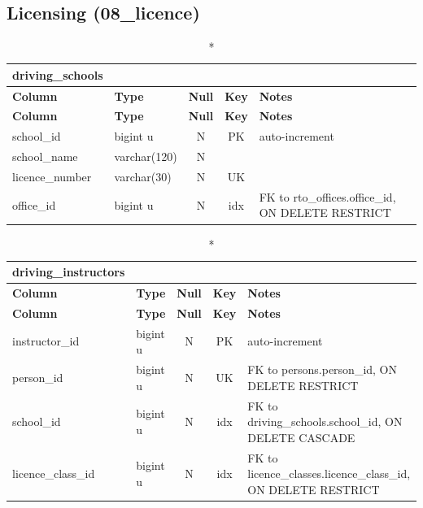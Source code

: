 \subsection*{Licensing (08\_licence)}
\begin{longtable}{@{}p{3.4cm}p{2.9cm}c c p{5.6cm}@{}}
\caption*{\textbf{driving\_\allowbreak{}schools}}\\
\toprule \textbf{Column} & \textbf{Type} & \textbf{Null} & \textbf{Key} & \textbf{Notes} \\ \midrule \endfirsthead
\toprule \textbf{Column} & \textbf{Type} & \textbf{Null} & \textbf{Key} & \textbf{Notes} \\ \midrule \endhead
\bottomrule \endlastfoot
school\_\allowbreak{}id & bigint u & N & PK & auto-increment \\
school\_\allowbreak{}name & varchar(120) & N &  &  \\
licence\_\allowbreak{}number & varchar(30) & N & UK &  \\
office\_\allowbreak{}id & bigint u & N & idx & FK to rto\_\allowbreak{}offices.office\_\allowbreak{}id, ON DELETE RESTRICT \\
\end{longtable}
\vspace{-0.4em}
\begin{longtable}{@{}p{3.4cm}p{2.9cm}c c p{5.6cm}@{}}
\caption*{\textbf{driving\_\allowbreak{}instructors}}\\
\toprule \textbf{Column} & \textbf{Type} & \textbf{Null} & \textbf{Key} & \textbf{Notes} \\ \midrule \endfirsthead
\toprule \textbf{Column} & \textbf{Type} & \textbf{Null} & \textbf{Key} & \textbf{Notes} \\ \midrule \endhead
\bottomrule \endlastfoot
instructor\_\allowbreak{}id & bigint u & N & PK & auto-increment \\
person\_\allowbreak{}id & bigint u & N & UK & FK to persons.person\_\allowbreak{}id, ON DELETE RESTRICT \\
school\_\allowbreak{}id & bigint u & N & idx & FK to driving\_\allowbreak{}schools.school\_\allowbreak{}id, ON DELETE CASCADE \\
licence\_\allowbreak{}class\_\allowbreak{}id & bigint u & N & idx & FK to licence\_\allowbreak{}classes.licence\_\allowbreak{}class\_\allowbreak{}id, ON DELETE RESTRICT \\
\end{longtable}
\vspace{-0.4em}
